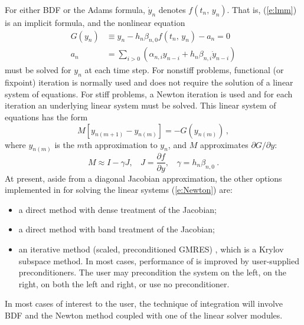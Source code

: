 For either BDF or the Adams formula, $\dot{y}_n$ denotes
$f(t_n,\,y_n)$. That is, (\ref{e:lmm}) is an implicit formula, and 
the nonlinear equation 
\begin{equation}\label{e:nonlinear}
\begin{split}
G(y_n) &\equiv  y_n-h_n\beta_{n,0}f(t_n,\,y_n) - a_n=0   \\
a_n &= \sum_{i>0}(\alpha_{n,i}y_{n-i}+h_n\beta_{n,i}\dot{y}_{n-i}) 
\end{split}
\end{equation}
must be solved for $y_{n}$ at each time step. For nonstiff problems,
functional (or fixpoint) iteration is normally used and does not
require the solution of a linear system of equations. For stiff
problems, a Newton iteration is used and for each iteration an
underlying linear system must be solved. This linear system of
equations has the form
\begin{equation}\label{e:Newton}
M[y_{n(m+1)}-y_{n(m)}]=-G(y_{n(m)}) \, ,
\end{equation}
where $y_{n(m)}$ is the $m$th approximation to $y_n$, and $M$
approximates $\partial G/ \partial y$:
\begin{equation} \label{e:N_Matrix}
M \approx I-\gamma J, ~~~~ J = \frac{\partial f}{\partial y}, ~~~~
    \gamma = h_n\beta_{n,0} ~.
\end{equation}
At present, aside from a diagonal Jacobian approximation, the other
options implemented in {\cvode} for solving the linear systems
(\ref{e:Newton}) are:
\begin{itemize}
\item a direct method with dense treatment of the Jacobian;
\item a direct method with band treatment of the Jacobian;
\item an iterative method {\spgmr} (scaled, preconditioned
GMRES) \cite{BrHi89}, which is a Krylov subspace method. In most
cases, performance of {\spgmr} is improved by user-supplied
preconditioners. The user may precondition the system on the left, on
the right, on both the left and right, or use no preconditioner.
\end{itemize}
In most cases of interest to the {\cvode} user, the technique of
integration will involve BDF and the Newton method coupled with one of the 
linear solver modules.

